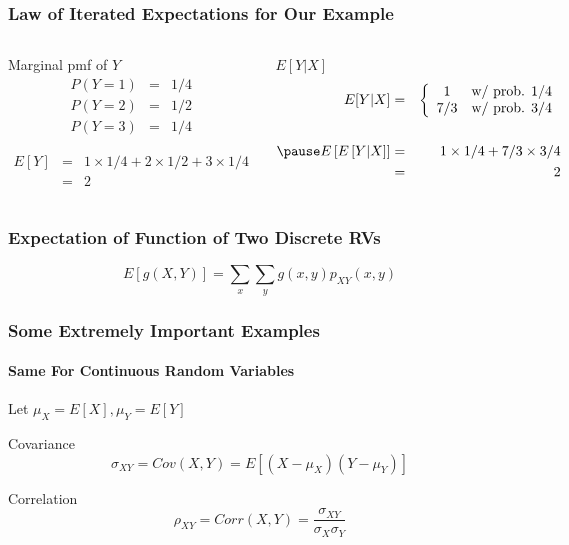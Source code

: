 \documentclass[handout]{beamer}
\begin{document}
\begin{frame}[t]
\frametitle{Law of Iterated Expectations for Our Example}

\begin{columns}
\footnotesize
{}
\begin{block}{Marginal pmf of $Y$}
\begin{eqnarray*}
	P(Y = 1) &=& 1/4 \\
	P(Y = 2) &=& 1/2\\
	P(Y = 3) &=& 1/4
\end{eqnarray*}
\pause

\begin{eqnarray*}
	E[Y] &=& 1\times 1/4 + 2 \times 1/2 + 3 \times 1/4\\
		&=&2
\end{eqnarray*}
\end{block}

\pause
{}
\begin{block}{$E[Y|X]$}
	\begin{eqnarray*}
	 E[Y|X] &=& \left\{\begin{array}{cc} 1& \mbox{w/ prob. } 1/4\\ 7/3& \mbox{w/ prob. } 3/4\end{array}\right.\\\\ \pause
	 E\left[E\left[Y|X \right] \right] &=& 1 \times 1/4 + 7/3 \times 3/4\\ 
	 &=& 2
	\end{eqnarray*}
	\vspace{1em}
\end{block}

\end{columns}

\end{frame}
\begin{frame}
\frametitle{Expectation of Function of Two Discrete RVs}
\Large
		$$\boxed{E[g(X,Y)] = \sum_x\sum_y g(x,y)p_{XY}(x,y)}$$
\end{frame}
\begin{frame}
\frametitle{Some Extremely Important Examples}
\framesubtitle{Same For Continuous Random Variables}
Let $\mu_X = E[X], \mu_Y = E[Y]$
\vspace{2em}

\begin{block}{Covariance}
$$\sigma_{XY} = Cov(X,Y) = E[(X-\mu_X)(Y - \mu_Y)]$$
\end{block}

\begin{block}{Correlation}
$$\rho_{XY} = Corr(X,Y) = \frac{\sigma_{XY}}{\sigma_X \sigma_Y}$$
\end{block}
\vspace{3em}
\end{frame}
\end{document}
